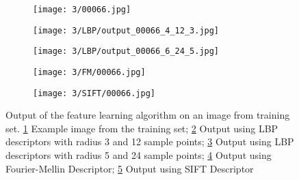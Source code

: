 \documentclass[draft,final]{vutinfth} %
\begin{document}
\begin{figure}[h]
  \centering
  \begin{subfigure}[t]{0.19\columnwidth}
    \centering
    \texttt{[image: 3/00066.jpg]}
    \subcaption{}
    \label{fig:pe:66:orig}
  \end{subfigure}
  \begin{subfigure}[t]{0.19\columnwidth}
    \centering
    \texttt{[image: 3/LBP/output\_00066\_4\_12\_3.jpg]}
    \subcaption{}
    \label{fig:pe:66:LBPs}
  \end{subfigure}
  \begin{subfigure}[t]{0.19\columnwidth}
    \centering
    \texttt{[image: 3/LBP/output\_00066\_6\_24\_5.jpg]}
    \subcaption{}
    \label{fig:pe:66:LBPb}
  \end{subfigure}
  \begin{subfigure}[t]{0.19\columnwidth}
    \centering
    \texttt{[image: 3/FM/00066.jpg]}
    \subcaption{}
    \label{fig:pe:66:FM}
  \end{subfigure}
  \begin{subfigure}[t]{0.19\columnwidth}
    \centering
    \texttt{[image: 3/SIFT/00066.jpg]}
    \subcaption{}
    \label{fig:pe:66:SIFT}
  \end{subfigure}
  \caption{Output of the feature learning algorithm on an image from training set. \ref{fig:pe:66:orig} Example image from the training set; \ref{fig:pe:66:LBPs} Output using LBP descriptors with radius 3 and 12 sample points; \ref{fig:pe:66:LBPb} Output using LBP descriptors with radius 5 and 24 sample points; \ref{fig:pe:66:FM} Output using Fourier-Mellin Descriptor; \ref{fig:pe:66:SIFT} Output using SIFT Descriptor}
  \label{fig:pe:66}
\end{figure}
\end{document}
